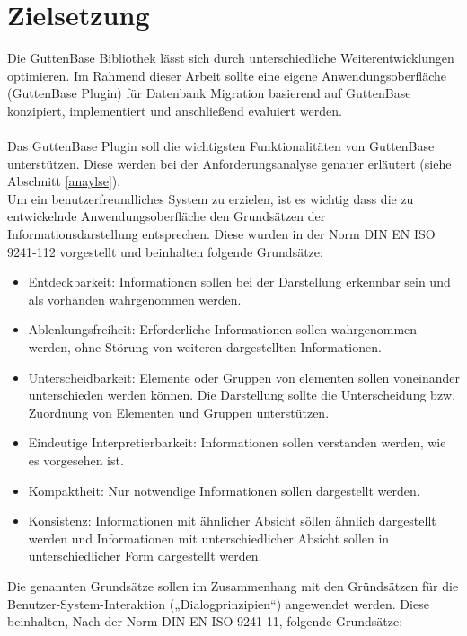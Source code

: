 \section{Zielsetzung}
Die GuttenBase Bibliothek lässt sich durch unterschiedliche Weiterentwicklungen optimieren. 
Im Rahmend dieser Arbeit sollte  eine eigene Anwendungsoberfläche (GuttenBase Plugin) für Datenbank Migration basierend auf GuttenBase konzipiert, implementiert und anschließend evaluiert werden. \\ \\
Das GuttenBase Plugin soll die wichtigsten Funktionalitäten von GuttenBase unterstützen. Diese werden bei der Anforderungsanalyse genauer erläutert (siehe Abschnitt \ref{anaylse}).\\
Um ein benutzerfreundliches System zu erzielen, ist es wichtig dass die zu entwickelnde Anwendungsoberfläche den Grundsätzen der Informationsdarstellung entsprechen. Diese wurden in der Norm DIN EN ISO 9241-112 vorgestellt und beinhalten folgende Grundsätze:
\begin{itemize}
	\item Entdeckbarkeit: 
	Informationen sollen bei der Darstellung erkennbar sein und als vorhanden wahrgenommen werden.
	
	\item Ablenkungsfreiheit: 
	Erforderliche Informationen sollen wahrgenommen werden, ohne Störung von weiteren dargestellten Informationen.
	
	\item Unterscheidbarkeit: 
	Elemente oder Gruppen von elementen sollen voneinander unterschieden werden können. Die Darstellung sollte die Unterscheidung bzw. Zuordnung von Elementen und Gruppen unterstützen.
	
	\item Eindeutige Interpretierbarkeit:
	Informationen sollen verstanden werden, wie es vorgesehen ist.
	
	\item Kompaktheit:
	Nur notwendige Informationen sollen dargestellt werden.
	
	\item Konsistenz:
	Informationen mit ähnlicher Absicht söllen ähnlich dargestellt werden und Informationen mit unterschiedlicher Absicht sollen in unterschiedlicher Form dargestellt werden.
	
\end{itemize}
Die genannten Grundsätze sollen im Zusammenhang mit den Gründsätzen für die Benutzer-System-Interaktion („Dialogprinzipien“) angewendet werden. Diese beinhalten, Nach der Norm DIN EN ISO 9241-11, folgende Grundsätze:
